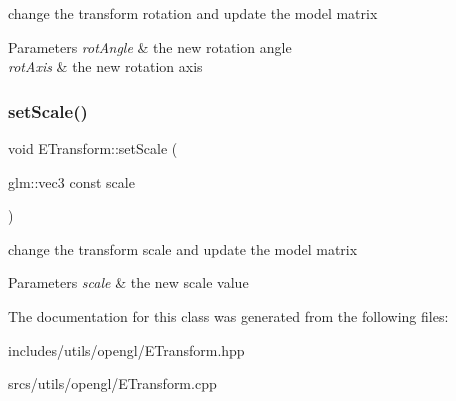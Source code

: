 change the transform rotation and update the model matrix 


\begin{DoxyParams}{Parameters}
{\em rot\+Angle} & the new rotation angle \\
\hline
{\em rot\+Axis} & the new rotation axis \\
\hline
\end{DoxyParams}
\mbox{\label{class_e_transform_acfb092c44d46a6266345ab27a3b4ff31}} 
\subsubsection{\texorpdfstring{set\+Scale()}{setScale()}}
{\footnotesize\ttfamily void E\+Transform\+::set\+Scale (\begin{DoxyParamCaption}\item[{glm\+::vec3 const}]{scale }\end{DoxyParamCaption})}



change the transform scale and update the model matrix 


\begin{DoxyParams}{Parameters}
{\em scale} & the new scale value \\
\hline
\end{DoxyParams}


The documentation for this class was generated from the following files\+:\begin{DoxyCompactItemize}
\item 
includes/utils/opengl/E\+Transform.\+hpp\item 
srcs/utils/opengl/E\+Transform.\+cpp\end{DoxyCompactItemize}
